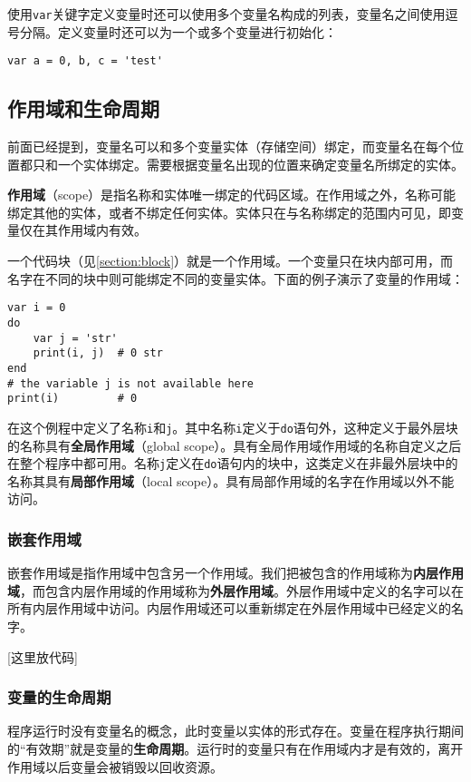 使用\texttt{var}关键字定义变量时还可以使用多个变量名构成的列表，变量名之间使用逗号分隔。定义变量时还可以为一个或多个变量进行初始化：
\begin{lstlisting}[language=berry, numbers=none]
var a = 0, b, c = 'test'
\end{lstlisting}

\subsection{作用域和生命周期}

前面已经提到，变量名可以和多个变量实体（存储空间）绑定，而变量名在每个位置都只和一个实体绑定。需要根据变量名出现的位置来确定变量名所绑定的实体。

\textbf{作用域}（scope）是指名称和实体唯一绑定的代码区域。在作用域之外，名称可能绑定其他的实体，或者不绑定任何实体。实体只在与名称绑定的范围内可见，即变量仅在其作用域内有效。

一个代码块（见\ref{section:block}）就是一个作用域。一个变量只在块内部可用，而名字在不同的块中则可能绑定不同的变量实体。下面的例子演示了变量的作用域：
\begin{lstlisting}[language=berry]
var i = 0
do
    var j = 'str'
    print(i, j)  # 0 str
end
# the variable j is not available here
print(i)         # 0
\end{lstlisting}
在这个例程中定义了名称\texttt{i}和\texttt{j}。其中名称\texttt{i}定义于\texttt{do}语句外，这种定义于最外层块的名称具有\textbf{全局作用域}（global scope）。具有全局作用域作用域的名称自定义之后在整个程序中都可用。名称\texttt{j}定义在\texttt{do}语句内的块中，这类定义在非最外层块中的名称其具有\textbf{局部作用域}（local scope）。具有局部作用域的名字在作用域以外不能访问。

\subsubsection{嵌套作用域}

嵌套作用域是指作用域中包含另一个作用域。我们把被包含的作用域称为\textbf{内层作用域}，而包含内层作用域的作用域称为\textbf{外层作用域}。外层作用域中定义的名字可以在所有内层作用域中访问。内层作用域还可以重新绑定在外层作用域中已经定义的名字。

[这里放代码]

\subsubsection{变量的生命周期}

程序运行时没有变量名的概念，此时变量以实体的形式存在。变量在程序执行期间的``有效期''就是变量的\textbf{生命周期}。运行时的变量只有在作用域内才是有效的，离开作用域以后变量会被销毁以回收资源。

